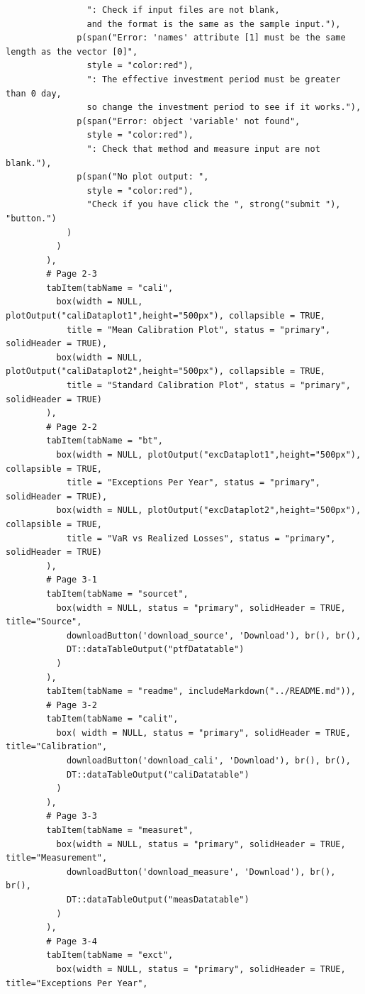 \documentclass[letterpaper,11pt, oneside]{layout}
\begin{document}
\begin{spacing}{1}
\begin{lstlisting}
                ": Check if input files are not blank, 
                and the format is the same as the sample input."),
              p(span("Error: 'names' attribute [1] must be the same length as the vector [0]", 
                style = "color:red"),
                ": The effective investment period must be greater than 0 day, 
                so change the investment period to see if it works."),
              p(span("Error: object 'variable' not found", 
                style = "color:red"),
                ": Check that method and measure input are not blank."),
              p(span("No plot output: ", 
                style = "color:red"),
                "Check if you have click the ", strong("submit "), "button.")
            )
          )
        ),
        # Page 2-3
        tabItem(tabName = "cali",
          box(width = NULL, plotOutput("caliDataplot1",height="500px"), collapsible = TRUE,
            title = "Mean Calibration Plot", status = "primary", solidHeader = TRUE),
          box(width = NULL, plotOutput("caliDataplot2",height="500px"), collapsible = TRUE,
            title = "Standard Calibration Plot", status = "primary", solidHeader = TRUE)
        ), 
        # Page 2-2
        tabItem(tabName = "bt",
          box(width = NULL, plotOutput("excDataplot1",height="500px"), collapsible = TRUE,
            title = "Exceptions Per Year", status = "primary", solidHeader = TRUE),
          box(width = NULL, plotOutput("excDataplot2",height="500px"), collapsible = TRUE,
            title = "VaR vs Realized Losses", status = "primary", solidHeader = TRUE)
        ), 
        # Page 3-1
        tabItem(tabName = "sourcet",
          box(width = NULL, status = "primary", solidHeader = TRUE, title="Source",  
            downloadButton('download_source', 'Download'), br(), br(),
            DT::dataTableOutput("ptfDatatable")
          )
        ),
        tabItem(tabName = "readme", includeMarkdown("../README.md")),
        # Page 3-2
        tabItem(tabName = "calit",
          box( width = NULL, status = "primary", solidHeader = TRUE, title="Calibration",
            downloadButton('download_cali', 'Download'), br(), br(),
            DT::dataTableOutput("caliDatatable")
          )
        ),
        # Page 3-3
        tabItem(tabName = "measuret",
          box(width = NULL, status = "primary", solidHeader = TRUE, title="Measurement", 
            downloadButton('download_measure', 'Download'), br(), br(),
            DT::dataTableOutput("measDatatable")
          )
        ),
        # Page 3-4
        tabItem(tabName = "exct",
          box(width = NULL, status = "primary", solidHeader = TRUE, title="Exceptions Per Year", 

\end{lstlisting}
\end{spacing}
\end{document}
